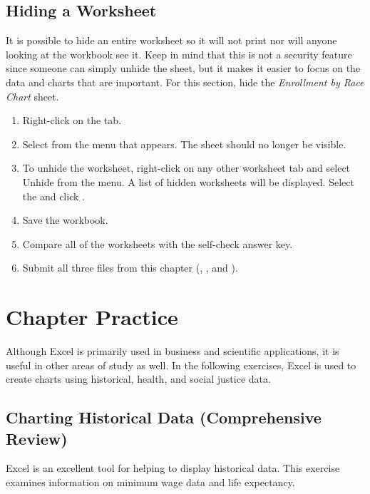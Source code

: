 \subsection{Hiding a Worksheet}

It is possible to hide an entire worksheet so it will not print nor will anyone looking at the workbook see it. Keep in mind that this is not a security feature since someone can simply unhide the sheet, but it makes it easier to focus on the data and charts that are important. For this section, hide the \textit{Enrollment by Race Chart} sheet.

\begin{enumerate}
	\item Right-click on the  tab.
	\item Select  from the menu that appears. The  sheet should no longer be visible.
	\item To unhide the worksheet, right-click on any other worksheet tab and select Unhide from the menu. A list of hidden worksheets will be displayed. Select the  and click .
	\item Save the  workbook.
	\item Compare all of the worksheets with the self-check answer key.
	\item Submit all three files from this chapter (, , and ).
\end{enumerate}

\section{Chapter Practice}

Although Excel is primarily used in business and scientific applications, it is useful in other areas of study as well. In the following exercises, Excel is used to create charts using historical, health, and social justice data.

\subsection{Charting Historical Data (Comprehensive Review)}

Excel is an excellent tool for helping to display historical data. This exercise examines information on minimum wage data and life expectancy.

